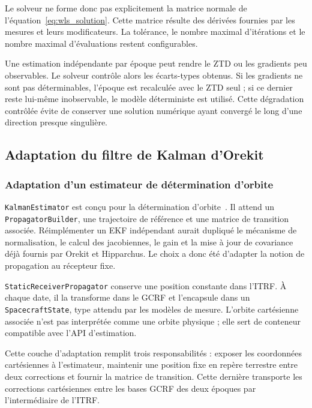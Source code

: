 Le solveur ne forme donc pas explicitement la matrice normale de
l'équation~\eqref{eq:wls_solution}. Cette matrice résulte des dérivées fournies
par les mesures et leurs modificateurs. La tolérance, le nombre maximal
d'itérations et le nombre maximal d'évaluations restent configurables.

Une estimation indépendante par époque peut rendre le ZTD ou les gradients
peu observables. Le solveur contrôle alors les écarts-types obtenus. Si les
gradients ne sont pas déterminables, l'époque est recalculée avec le ZTD seul ;
si ce dernier reste lui-même inobservable, le modèle déterministe est utilisé.
Cette dégradation contrôlée évite de conserver une solution numérique ayant
convergé le long d'une direction presque singulière.

\subsection{Adaptation du filtre de Kalman d'Orekit}

\subsubsection{Adaptation d'un estimateur de détermination d'orbite}

\texttt{KalmanEstimator} est conçu pour la détermination d'orbite~\cite{orekit131api}. Il attend
un \texttt{PropagatorBuilder}, une trajectoire de référence et une matrice de
transition associée. Réimplémenter un EKF indépendant aurait dupliqué le
mécanisme de normalisation, le calcul des jacobiennes, le gain et la mise à
jour de covariance déjà fournis par Orekit et Hipparchus. Le choix a donc été
d'adapter la notion de propagation au récepteur fixe.

\texttt{StaticReceiverPropagator} conserve une position constante dans
l'ITRF. À chaque date, il la transforme dans le GCRF et l'encapsule dans un
\texttt{SpacecraftState}, type attendu par les modèles de mesure. L'orbite
cartésienne associée n'est pas interprétée comme une orbite physique ; elle
sert de conteneur compatible avec l'API d'estimation.

Cette couche d'adaptation remplit trois responsabilités : exposer les
coordonnées cartésiennes à l'estimateur, maintenir une position fixe en repère
terrestre entre deux corrections et fournir la matrice de transition. Cette
dernière transporte les corrections cartésiennes entre les bases GCRF des deux
époques par l'intermédiaire de l'ITRF.

